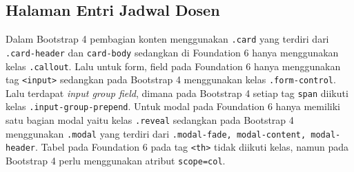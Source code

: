 \subsection{Halaman Entri Jadwal Dosen}
Dalam Bootstrap 4 pembagian konten menggunakan \texttt{.card} yang terdiri dari \texttt{.card-header} dan \texttt{card-body} sedangkan di Foundation 6 hanya menggunakan kelas \texttt{.callout}. 
Lalu untuk form, field pada Foundation 6 hanya menggunakan tag \texttt{<input>} sedangkan pada Bootstrap 4 menggunakan kelas \texttt{.form-control}.
Lalu terdapat \textit{input group field}, dimana pada Bootstrap 4 setiap tag \texttt{span} diikuti kelas \texttt{.input-group-prepend}.
Untuk modal pada Foundation 6 hanya memiliki satu bagian modal yaitu kelas \texttt{.reveal} sedangkan pada Bootstrap 4 menggunakan \texttt{.modal} yang terdiri dari \texttt{.modal-fade, modal-content, modal-header}.
Tabel pada Foundation 6 pada tag \texttt{<th>} tidak diikuti kelas, namun pada Bootstrap 4 perlu menggunakan atribut \texttt{scope=col}.
